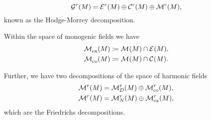 \begin{equation}
\mathcal{G}^r(M) = \mathcal{E}^{r}(M) \oplus \mathcal{C}^{r}(M) \oplus \mathcal{M}^{r}(M),
\end{equation}
known as the Hodge-Morrey decomposition.
\begin{definition}
Within the space of monogenic fields we have
\begin{align}
    \mathcal{M}^{}_{\textrm{ex}}(M) &\coloneqq \mathcal{M}^{}(M)\cap \mathcal{E}^{}(M),\\
    \mathcal{M}^{}_{\textrm{co}}(M) &\coloneqq \mathcal{M}^{}(M) \cap \mathcal{C}^{}(M).
\end{align}
\end{definition}
Further, we have two decompositions of the space of harmonic fields 
\begin{align}
    \mathcal{M}^{r}(M) &= \mathcal{M}^{r}_D(M) \oplus \mathcal{M}^{r}_{\textrm{co}}(M), \\
    \mathcal{M}^{r}(M) &= \mathcal{M}^{r}_N(M) \oplus \mathcal{M}^{r}_{\textrm{ex}}(M),
\end{align}
which are the Friedrichs decompositions. 

